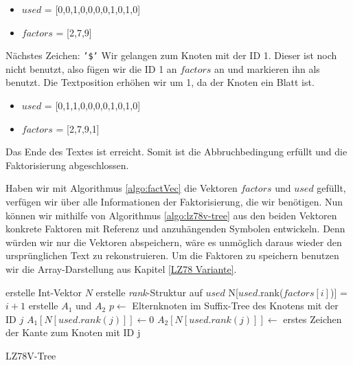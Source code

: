 \documentclass[a4paper,11pt]{scrartcl}%
\theoremstyle{change}
\theoremstyle{nonumberplain}
\theoremstyle{change}
\theoremstyle{nonumberplain}
\theoremstyle{change}
\theoremstyle{nonumberplain}
\begin{document}
\begin{itemize}
	\item $used$ = [0,0,1,0,0,0,0,1,0,1,0]
	\item $factors$ = [2,7,9]
\end{itemize}

Nächstes Zeichen: \texttt{'\$'}
Wir gelangen zum Knoten mit der ID 1. Dieser ist noch nicht benutzt, also fügen wir die ID 1 an $factors$ an und markieren ihn als benutzt. Die Textposition erhöhen wir um 1, da der Knoten ein Blatt ist.

\begin{itemize}
	\item $used$ = [0,1,1,0,0,0,0,1,0,1,0]
	\item $factors$ = [2,7,9,1]
\end{itemize}

Das Ende des Textes ist erreicht. Somit ist die Abbruchbedingung erfüllt und die Faktorisierung abgeschlossen.

\hspace{20px}

Haben wir mit Algorithmus \ref{algo:factVec} die Vektoren $factors$ und $used$ gefüllt, verfügen wir über alle Informationen der Faktorisierung, die wir benötigen. Nun können wir mithilfe von Algorithmus \ref{algo:lz78v-tree} aus den beiden Vektoren konkrete Faktoren mit Referenz und anzuhängenden Symbolen entwickeln. Denn würden wir nur die Vektoren abspeichern, wäre es unmöglich daraus wieder den ursprünglichen Text zu rekonstruieren. Um die Faktoren zu speichern benutzen wir die Array-Darstellung aus Kapitel \ref{LZ78 Variante}.

\begin{algorithm}\label{algo:lz78v-tree}
	\SetAlgoLined
	\SetAlgoNoEnd%
	erstelle Int-Vektor $N$\;
	erstelle \textit{rank}-Struktur auf $used$\;
	 {
		N[$used$.rank($factors[i]$)] = $i + 1$\;
	} \label{line:nFilled}
	erstelle $A_1$ und $A_2$\;
	 {
		 { 
			$p\leftarrow$ Elternknoten im Suffix-Tree des Knotens mit der ID $j$\;
			 {
				$A_1[N[used.rank(j)]] \leftarrow 0$\;
			} 
			 {
				$A_2[N[used.rank(j)]] \leftarrow$ erstes Zeichen der Kante zum Knoten mit ID j\;
			} 		
		}
	}
	
	\caption{LZ78V-Tree}
	\label{algo:lz78v-tree}
\end{algorithm}
\end{document}
